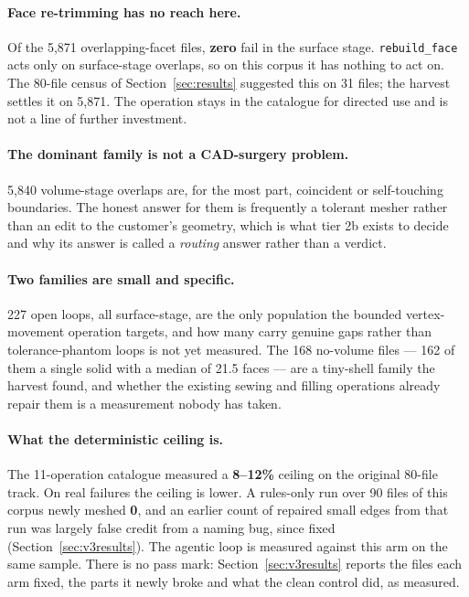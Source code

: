 \documentclass[11pt,onecolumn]{article}
\newcommand{\code}[1]{\texttt{\small #1}}
\begin{document}
\paragraph{Face re-trimming has no reach here.}
Of the 5{,}871 overlapping-facet files, \textbf{zero}
fail in the surface stage. \code{rebuild\_face} acts only on surface-stage overlaps, so on this
corpus it has nothing to act on. The 80-file census of Section~\ref{sec:results} suggested this on
31 files; the harvest settles it on 5{,}871. The operation stays in the catalogue for directed use
and is not a line of further investment.

\paragraph{The dominant family is not a CAD-surgery problem.}
5{,}840 volume-stage overlaps are, for the
most part, coincident or self-touching boundaries. The honest answer for them is frequently a
tolerant mesher rather than an edit to the customer's geometry, which is what tier 2b exists to
decide and why its answer is called a \emph{routing} answer rather than a verdict.

\paragraph{Two families are small and specific.}
227 open loops, all surface-stage, are the only
population the bounded vertex-movement operation targets, and how many carry genuine gaps rather
than tolerance-phantom loops is not yet measured. The 168 no-volume files --- 162 of them a single
solid with a median of 21.5 faces --- are a tiny-shell family the harvest found, and whether the
existing sewing and filling operations already repair them is a measurement nobody has taken.

\paragraph{What the deterministic ceiling is.}
The 11-operation catalogue measured a \textbf{8--12\%}
ceiling on the original 80-file track. On real failures the ceiling is lower. A rules-only run
over 90 files of this corpus newly meshed \textbf{0}, and an earlier count of repaired small edges
from that run was largely false credit from a naming bug, since fixed
(Section~\ref{sec:v3results}). The agentic loop is measured against this arm on the same sample.
There is no pass mark: Section~\ref{sec:v3results} reports the files each arm fixed, the parts it
newly broke and what the clean control did, as measured.
\end{document}
